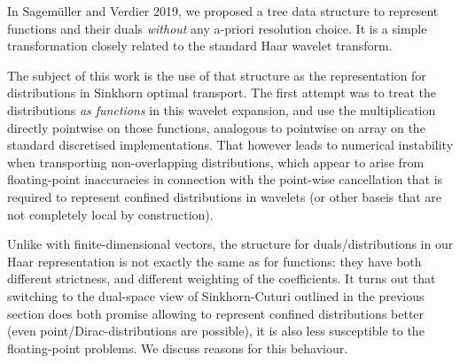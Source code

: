 \documentclass[a4paper]{easychair}
\begin{document}
In Sagemüller and Verdier 2019\cite{SagVerdier-LazyWavelet}, we proposed a tree data structure to represent functions and their duals \emph{without} any a-priori resolution choice. It is a simple transformation closely related to the standard Haar wavelet transform.

The subject of this work is the use of that structure as the representation for distributions in Sinkhorn optimal transport. The first attempt was to treat the distributions \emph{as functions} in this wavelet expansion, and use the multiplication directly pointwise on those functions, analogous to pointwise on array on the standard discretised implementations.
That however leads to numerical instability when transporting non-overlapping distributions, which appear to arise from floating-point inaccuracies in connection with the point-wise cancellation that is required to represent confined distributions in wavelets (or other baseis that are not completely local by construction).

Unlike with finite-dimensional vectors, the structure for duals/distributions in our Haar representation is not exactly the same as for functions: they have both different strictness, and different weighting of the coefficients.
It turns out that switching to the dual-space view of Sinkhorn-Cuturi outlined in the previous section does both promise allowing to represent confined distributions better (even point/Dirac-distributions are possible), it is also less susceptible to the floating-point problems. We discuss reasons for this behaviour.



%
%

%
%
%



\end{document}
